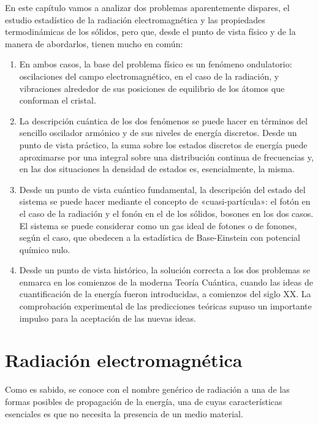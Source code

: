 En este capítulo vamos a analizar dos problemas aparentemente dispares, el estudio estadístico de la radiación electromagnética y las propiedades termodinámicas de los sólidos, pero que, desde el punto de vista físico y de la manera de abordarlos, tienen mucho en común:
\begin{enumerate}
	\item En ambos casos, la base del problema físico es un fenómeno ondulatorio: oscilaciones del campo electromagnético, en el caso de la radiación, y vibraciones alrededor de sus posiciones de equilibrio de los átomos que conforman el cristal.

	\item La descripción cuántica de los dos fenómenos se puede hacer en términos del sencillo oscilador armónico y de sus niveles de energía discretos. Desde un punto de vista práctico, la suma sobre los estados discretos de energía puede aproximarse por una integral sobre una distribución continua de frecuencias y, en las dos situaciones la densidad de estados es, esencialmente, la misma.
	
	\item Desde un punto de vista cuántico fundamental, la descripción del estado del sistema se puede hacer mediante el concepto de «cuasi-partícula»: el fotón en el caso de la radiación y el fonón en el de los sólidos, bosones en los dos casos. El sistema se puede considerar como un gas ideal de fotones o de fonones, según el caso, que obedecen a la estadística de Base-Einstein con potencial químico nulo.

	\item Desde un punto de vista histórico, la solución correcta a los dos problemas se enmarca en los comienzos de la moderna Teoría Cuántica, cuando las ideas de cuantificación de la energía fueron introducidas, a comienzos del siglo XX. La comprobación experimental de las predicciones teóricas supuso un importante impulso para la aceptación de las nuevas ideas.
\end{enumerate}

\newpage
\section{Radiación electromagnética}

Como es sabido, se conoce con el nombre genérico de radiación a una de las formas posibles de propagación de la energía, una de cuyas características esenciales es que no necesita la presencia de un medio material.

